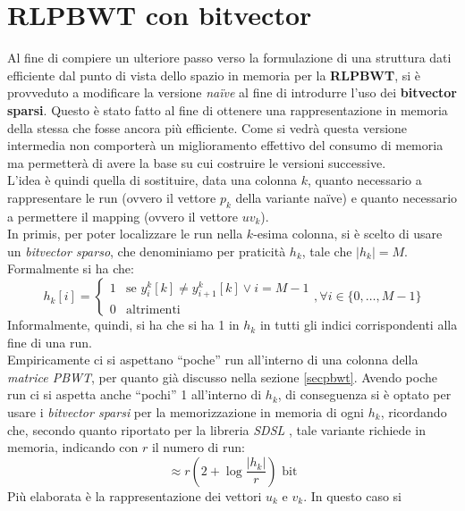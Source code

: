 \section{RLPBWT con bitvector}
\label{secrlpbwtbv}
Al fine di compiere un ulteriore passo verso la formulazione di una struttura
dati efficiente dal punto di vista dello spazio in memoria per la
\textbf{RLPBWT}, si è provveduto a modificare la versione \textit{na\"{i}ve} al
fine 
di introdurre l'uso dei \textbf{bitvector sparsi}. Questo è stato fatto al fine
di 
ottenere una rappresentazione in memoria della stessa che fosse ancora più
efficiente. Come si vedrà questa versione intermedia non comporterà un
miglioramento effettivo del consumo di memoria ma permetterà di avere la base su
cui costruire le versioni successive.\\
L'idea è quindi quella di sostituire, data una colonna $k$, quanto necessario a
rappresentare le run (ovvero il vettore $p_k$ della variante na\"{i}ve) e quanto
necessario a permettere il mapping (ovvero il vettore $uv_k$).\\
In primis, per poter localizzare le run nella $k$-esima colonna, si è scelto di
usare un \textit{bitvector sparso}, che denominiamo per praticità $h_k$, tale
che $|h_k|=M$. Formalmente si ha che:
\begin{equation}
  \label{eq:bv1}
  h_k[i]=
  \begin{cases}
    1&\mbox{se } y^k_{i}[k]\neq y^k_{i+1}[k]\lor i=M-1\\
    0&\mbox{altrimenti}
  \end{cases},\forall i\in \{0,\ldots,M-1\}
\end{equation}
Informalmente, quindi, si ha che si ha 1 in $h_k$ in tutti gli indici
corrispondenti alla fine di una run.\\
Empiricamente ci si aspettano ``poche'' run all'interno di una colonna della
\textit{matrice PBWT}, per quanto già discusso nella sezione
\ref{secpbwt}. Avendo poche run ci si aspetta anche ``pochi'' 1 all'interno di
$h_k$, di conseguenza si è optato per usare i \textit{bitvector sparsi} per la
memorizzazione in memoria di ogni $h_k$, ricordando che, secondo quanto
riportato per la libreria \textit{SDSL} \cite{sdsl}, tale variante richiede in
memoria, indicando con $r$ il numero di run:
\begin{equation}
  \label{eq:bv2}
  \approx r\left(2+\log\frac{|h_k|}{r}\right)\mbox{ bit}
\end{equation}
Più elaborata è la rappresentazione dei vettori $u_k$ e $v_k$. In questo caso si

